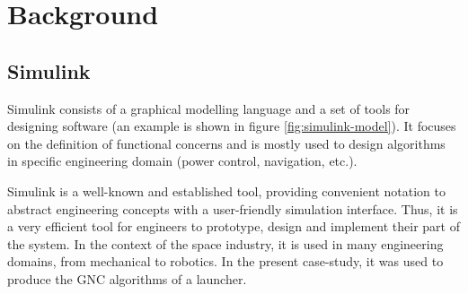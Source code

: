 \documentclass[10pt, conference, compsocconf]{IEEEtran}
\begin{document}

\section{Background}

   \subsection{Simulink}
   Simulink consists of a graphical modelling language and a set of tools for designing
   software (an example is shown in figure \ref{fig:simulink-model}). It focuses on the definition of functional
   concerns and is mostly used to design algorithms in specific engineering
   domain (power control, navigation, etc.).

   Simulink is a well-known and established tool, providing
   convenient notation to abstract engineering concepts with
   a user-friendly simulation interface. Thus, it is a very efficient
   tool for engineers to prototype, design
   and implement their part of the system. In the context of the space
   industry, it is used in many engineering domains, from mechanical to robotics.
   In the present case-study, it was used to produce the GNC
   algorithms of a launcher.
\end{document}
